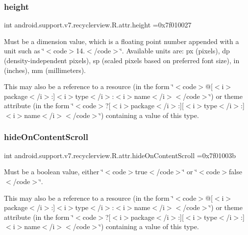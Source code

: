 \subsubsection{\texorpdfstring{height}{height}}
{\footnotesize\ttfamily int android.\+support.\+v7.\+recyclerview.\+R.\+attr.\+height =0x7f010027\hspace{0.3cm}{\ttfamily [static]}}

Must be a dimension value, which is a floating point number appended with a unit such as \char`\"{}$<$code$>$14.\+5sp$<$/code$>$\char`\"{}. Available units are\+: px (pixels), dp (density-\/independent pixels), sp (scaled pixels based on preferred font size), in (inches), mm (millimeters). 

This may also be a reference to a resource (in the form \char`\"{}$<$code$>$@\mbox{[}$<$i$>$package$<$/i$>$\+:\mbox{]}$<$i$>$type$<$/i$>$\+:$<$i$>$name$<$/i$>$$<$/code$>$\char`\"{}) or theme attribute (in the form \char`\"{}$<$code$>$?\mbox{[}$<$i$>$package$<$/i$>$\+:\mbox{]}\mbox{[}$<$i$>$type$<$/i$>$\+:\mbox{]}$<$i$>$name$<$/i$>$$<$/code$>$\char`\"{}) containing a value of this type. \mbox{\label{classandroid_1_1support_1_1v7_1_1recyclerview_1_1R_1_1attr_a8c9fbc098ad655e3d974d4367da709bd}} 
\subsubsection{\texorpdfstring{hide\+On\+Content\+Scroll}{hideOnContentScroll}}
{\footnotesize\ttfamily int android.\+support.\+v7.\+recyclerview.\+R.\+attr.\+hide\+On\+Content\+Scroll =0x7f01003b\hspace{0.3cm}{\ttfamily [static]}}

Must be a boolean value, either \char`\"{}$<$code$>$true$<$/code$>$\char`\"{} or \char`\"{}$<$code$>$false$<$/code$>$\char`\"{}. 

This may also be a reference to a resource (in the form \char`\"{}$<$code$>$@\mbox{[}$<$i$>$package$<$/i$>$\+:\mbox{]}$<$i$>$type$<$/i$>$\+:$<$i$>$name$<$/i$>$$<$/code$>$\char`\"{}) or theme attribute (in the form \char`\"{}$<$code$>$?\mbox{[}$<$i$>$package$<$/i$>$\+:\mbox{]}\mbox{[}$<$i$>$type$<$/i$>$\+:\mbox{]}$<$i$>$name$<$/i$>$$<$/code$>$\char`\"{}) containing a value of this type. \mbox{\label{classandroid_1_1support_1_1v7_1_1recyclerview_1_1R_1_1attr_aee90ab6afdbefc61216110e2d9e4c6fd}} 
